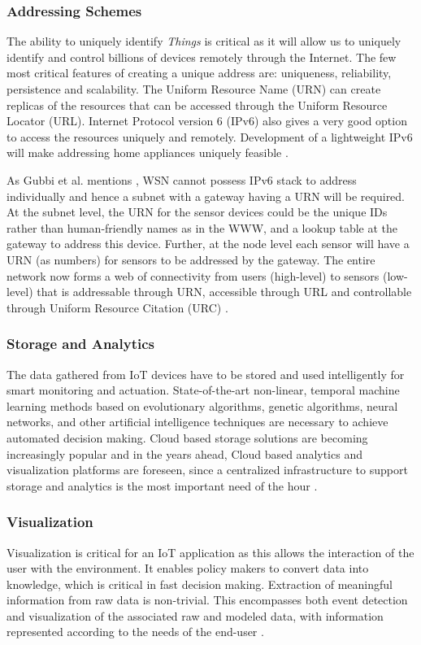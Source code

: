 {\subsubsection{Addressing Schemes}
The ability to uniquely identify \textit{Things} is critical as it will allow us to uniquely identify and control billions of devices remotely through the Internet. The few most critical features of creating a unique address are: uniqueness, reliability, persistence and scalability. The Uniform Resource Name (\acs{URN}) can create replicas of the resources that can be accessed through the Uniform Resource Locator (\acs{URL}). Internet Protocol version 6 (\acs{IPv6}) also gives a very good option to access the resources uniquely and remotely. Development of a lightweight \acs{IPv6} will make addressing home appliances uniquely feasible \cite{IOTGUBBI}. 

As Gubbi et al. mentions \cite{IOTGUBBI}, \acs{WSN} cannot possess \acs{IPv6} stack to address individually and hence a subnet with a gateway having a \acs{URN} will be required. At the subnet level, the \acs{URN} for the sensor devices could be the unique IDs rather than human-friendly names as in the \acs{WWW}, and a lookup table at the gateway to address this device. Further, at the node level each sensor will have a \acs{URN} (as numbers) for sensors to be addressed by the gateway. The entire network now forms a web of connectivity from users (high-level) to sensors (low-level) that is addressable through \acs{URN}, accessible through \acs{URL} and controllable through Uniform Resource Citation (\acs{URC}) \cite{IOTGUBBI}.

\subsubsection{Storage and Analytics}
The data gathered from \acs{IoT} devices have to be stored and used intelligently for smart monitoring and actuation. State-of-the-art non-linear, temporal machine learning methods based on evolutionary algorithms, genetic algorithms, neural networks, and other artificial intelligence techniques are necessary to achieve automated decision making. Cloud based storage solutions are becoming increasingly popular and in the years ahead, Cloud based analytics and visualization platforms are foreseen, since a centralized infrastructure to support storage and analytics is the most important need of the hour \cite{IOTGUBBI}.

\subsubsection{Visualization}
Visualization is critical for an \acs{IoT} application as this allows the interaction of the user with the environment. It enables policy makers to convert data into knowledge, which is critical in fast decision making. Extraction of meaningful information from raw data is non-trivial. This encompasses both event detection and visualization of the associated raw and modeled data, with information represented according to the needs of the end-user \cite{IOTGUBBI}.

}
